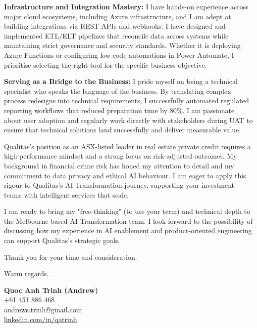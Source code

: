 \documentclass[11pt, a4paper]{article}
\begin{document}
\textbf{Infrastructure and Integration Mastery:}
I have hands-on experience across major cloud ecosystems, including Azure infrastructure, and I am adept at building integrations via REST APIs and webhooks. I have designed and implemented ETL/ELT pipelines that reconcile data across systems while maintaining strict governance and security standards. Whether it is deploying Azure Functions or configuring low-code automations in Power Automate, I prioritise selecting the right tool for the specific business objective.

\textbf{Serving as a Bridge to the Business:}
I pride myself on being a technical specialist who speaks the language of the business. By translating complex process redesigns into technical requirements, I successfully automated regulated reporting workflows that reduced preparation time by 80\%. I am passionate about user adoption and regularly work directly with stakeholders during UAT to ensure that technical solutions land successfully and deliver measurable value.

Qualitas’s position as an ASX-listed leader in real estate private credit requires a high-performance mindset and a strong focus on risk-adjusted outcomes. My background in financial crime risk has honed my attention to detail and my commitment to data privacy and ethical AI behaviour. I am eager to apply this rigour to Qualitas’s AI Transformation journey, supporting your investment teams with intelligent services that scale.

I am ready to bring my "free-thinking" (to use your term) and technical depth to the Melbourne-based AI Transformation team. I look forward to the possibility of discussing how my experience in AI enablement and product-oriented engineering can support Qualitas's strategic goals.

Thank you for your time and consideration.

\vspace{20pt}

Warm regards,

\vspace{30pt}

\textbf{Quoc Anh Trinh (Andrew)}\\
+61 451 886 468\\
\href{mailto:andrews.trinh@gmail.com}{andrews.trinh@gmail.com}\\
\href{https://www.linkedin.com/in/qatrinh}{linkedin.com/in/qatrinh}
\end{document}
